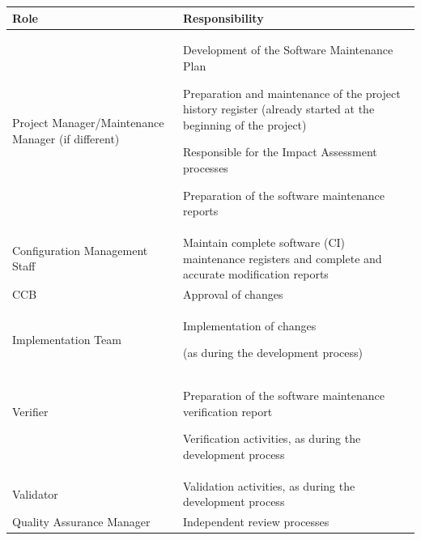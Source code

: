 \documentclass{template/openetcs_article}
\begin{document}
\begin{flushleft}
\tablefirsthead{}
\tablehead{}
\tabletail{}
\tablelasttail{}
\begin{supertabular}{|m{5cm}|m{9cm}|}
\hline
{}
Role &
Responsibility\\\hline
Project Manager/Maintenance Manager (if different) &
Development of the Software Maintenance Plan

Preparation and maintenance of the project history register (already started at the beginning of the project)

Responsible for the Impact Assessment processes

Preparation of the software maintenance reports\\\hline
Configuration Management Staff &
Maintain complete software (CI) maintenance registers and complete and accurate modification reports\\\hline
CCB &
Approval of changes\\\hline
Implementation Team &
Implementation of changes

(as during the development process)\\\hline
Verifier

~
 &
Preparation of the software maintenance verification report

Verification activities, as during the development process\\\hline
Validator &
Validation activities, as during the development process\\\hline
Quality Assurance Manager &
Independent review processes\\\hline
\end{supertabular}
\end{flushleft}
\end{document}
